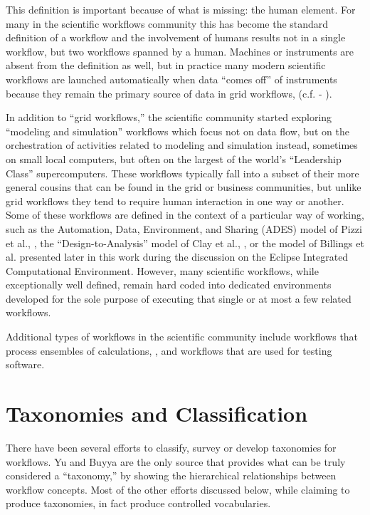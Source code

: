 This definition is important because of what is missing: the human
element. For many in the scientific workflows community this has become
the standard definition of a workflow and the involvement of humans
results not in a single workflow, but two workflows spanned by a human.
Machines or instruments are absent from the definition as well, but in
practice many modern scientific workflows are launched automatically
when data ``comes off'' of instruments because they remain the primary
source of data in grid workflows, (c.f. - \cite{megino_panda:_2015}).

In addition to ``grid workflows,'' the scientific community started
exploring ``modeling and simulation'' workflows which focus not on data
flow, but on the orchestration of activities related to modeling and
simulation instead, sometimes on small local computers, but often on the
largest of the world's ``Leadership Class'' supercomputers. These
workflows typically fall into a subset of their more general cousins
that can be found in the grid or business communities, but unlike grid
workflows they tend to require human interaction in one way or another.
Some of these workflows are defined in the context of a particular way
of working, such as the Automation, Data, Environment, and Sharing
(ADES) model of Pizzi et al., \cite{pizzi_aiida:_2016}, the
``Design-to-Analysis'' model of Clay et al., \cite{clay_incorporating_2015}, or
the model of Billings et al. presented later in this work during the
discussion on the Eclipse Integrated Computational Environment. However,
many scientific workflows, while exceptionally well defined, remain hard
coded into dedicated environments developed for the sole purpose of
executing that single or at most a few related workflows.

Additional types of workflows in the scientific community include
workflows that process ensembles of calculations, \cite{montoya_apex_2016},
and workflows that are used for testing software.

\section{Taxonomies and
Classification}\label{taxonomies-and-classification}

There have been several efforts to classify, survey or develop taxonomies
for workflows. Yu and Buyya are the only source that provides what can
be truly considered a ``taxonomy,'' by showing the hierarchical
relationships between workflow concepts. Most of the other efforts
discussed below, while claiming to produce taxonomies, in fact produce
controlled vocabularies.


